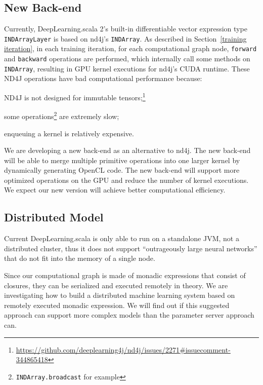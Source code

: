 \subsection{New Back-end}\label{New Back-end}
Currently, DeepLearning.scala 2's built-in differentiable vector expression type \lstinline{INDArrayLayer} is based on nd4j's \lstinline{INDArray}\cite{skymind2017nd4j}.
As described in Section~\ref{training iteration}, in each training iteration, for each \gls{computational graph} node, \lstinline{forward} and \lstinline{backward} operations are performed, which internally call some methods on \lstinline{INDArray}, resulting in GPU kernel executions for nd4j's CUDA runtime. These ND4J operations have bad computational performance because:
\begin{enumerate*}
  \item ND4J is not designed for immutable tensors;\footnote{\url{https://github.com/deeplearning4j/nd4j/issues/2271\#issuecomment-344865418}}
  \item some operations\footnote{\lstinline{INDArray.broadcast} for example} are extremely slow;
  \item enqueuing a kernel is relatively expensive.
\end{enumerate*}

 We are developing a new back-end as an alternative to nd4j. The new back-end will be able to merge multiple primitive operations into one larger kernel by dynamically generating OpenCL code. The new back-end
 will support more optimized operations on the GPU and reduce the number of kernel executions. We expect our new version will achieve better computational efficiency.

\subsection{Distributed Model}

Current DeepLearning.scala is only able to run on a standalone JVM, not a distributed cluster, thus it does not support ``outrageously large neural networks''\cite{shazeer2017outrageously} that do not fit into the memory of a single node.

Since our \gls{computational graph} is made of monadic expressions that consist of closures, they can be serialized and executed remotely in theory. We are investigating how to build a distributed machine learning system based on remotely executed monadic expression. We will find out if this suggested approach can support more complex models than the parameter server approach can.




